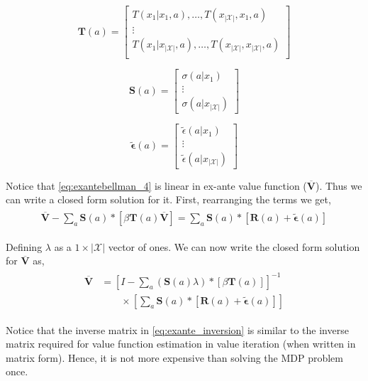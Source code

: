 \documentclass{article}
\begin{document}
\[
\mathbf{T}(a)=\left[\begin{array}{ccc}
T(x_1|x_1,a),\dots,T(x_{|\mathcal{X}|},x_1,a)\\
\vdots\\
T(x_1|x_{|\mathcal{X}|},a),\dots,T(x_{|\mathcal{X}|},x_{|\mathcal{X}|},a)\\
\end{array}\right]
\]

\[
\mathbf{S}(a)=\left[\begin{array}{c}\sigma(a|x_1)\\ \vdots\\ \sigma(a|x_{|\mathcal{X}|})\end{array} \right]
\]

\[
\tilde{\bm{\epsilon}}(a)=\left[\begin{array}{c}\tilde{\epsilon}(a|x_1)\\ \vdots \\ \tilde{\epsilon}(a|x_{|\mathcal{X}|})\end{array}\right]
\]



Notice that \eqref{eq:exantebellman_4} is linear in ex-ante value function ($\overline{\mathbf{V}}$). Thus we can write a closed form solution for it.
First, rearranging the terms we get,
\begin{align}
    \begin{split}
    \overline{\mathbf{V}}-\sum_{a}\mathbf{S}(a) *\left[ \beta \mathbf{T}(a) \overline{\mathbf{V}}\right]=\sum_{a}\mathbf{S}(a) *\left[ \mathbf{R}(a)+\tilde{\bm{\epsilon}}(a)\right]
    \end{split}
\end{align}

Defining $\lambda$ as a $1\times|\mathcal{X}|$ vector of ones.
We can now write the closed form solution for $\overline{\mathbf{V}}$ as,
\begin{align} \label{eq:exante_inversion}
\begin{split}
\overline{\mathbf{V}} &=\left[I-\sum_{a}(\mathbf{S}(a) \lambda) *\left[ \beta \mathbf{T}(a)  \right]\right]^{-1} \\
& \qquad \times \left[\sum_{a}\mathbf{S}(a) *\left[ \mathbf{R}(a)+\tilde{\bm{\epsilon}}(a)\right]\right]
\end{split}
\end{align}

Notice that the inverse matrix in \eqref{eq:exante_inversion} is similar to the inverse matrix required for value function estimation in value iteration (when written in matrix form). Hence, it is not more expensive than solving the MDP problem once.
\end{document}
